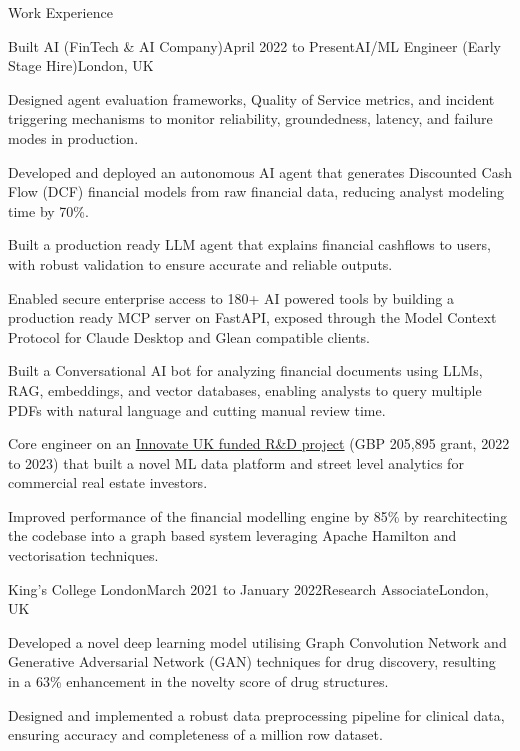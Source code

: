\documentclass{resume}
\begin{document}
\begin{rSection}{Work Experience}
\begin{rSubsection}{Built AI (FinTech \& AI Company)}{April 2022 to Present}{AI/ML Engineer (Early Stage Hire)}{London, UK}
\item Designed agent evaluation frameworks, Quality of Service metrics, and incident triggering mechanisms to monitor reliability, groundedness, latency, and failure modes in production.
\item Developed and deployed an autonomous AI agent that generates Discounted Cash Flow (DCF) financial models from raw financial data, reducing analyst modeling time by 70\%.
\item Built a production ready LLM agent that explains financial cashflows to users, with robust validation to ensure accurate and reliable outputs.
\item Enabled secure enterprise access to 180+ AI powered tools by building a production ready MCP server on FastAPI, exposed through the Model Context Protocol for Claude Desktop and Glean compatible clients.
\item Built a Conversational AI bot for analyzing financial documents using LLMs, RAG, embeddings, and vector databases, enabling analysts to query multiple PDFs with natural language and cutting manual review time.
\item Core engineer on an \href{https://gtr.ukri.org/projects?ref=10022996}{Innovate UK funded R\&D project} (GBP 205,895 grant, 2022 to 2023) that built a novel ML data platform and street level analytics for commercial real estate investors.
\item Improved performance of the financial modelling engine by 85\% by rearchitecting the codebase into a graph based system leveraging Apache Hamilton and vectorisation techniques.
\end{rSubsection}

\begin{rSubsection}{King's College London}{March 2021 to January 2022}{Research Associate}{London, UK}
\item Developed a novel deep learning model utilising Graph Convolution Network and Generative Adversarial Network (GAN) techniques for drug discovery, resulting in a 63\% enhancement in the novelty score of drug structures.
\item Designed and implemented a robust data preprocessing pipeline for clinical data, ensuring accuracy and completeness of a million row dataset.
\end{rSubsection}
\end{rSection}
\end{document}
